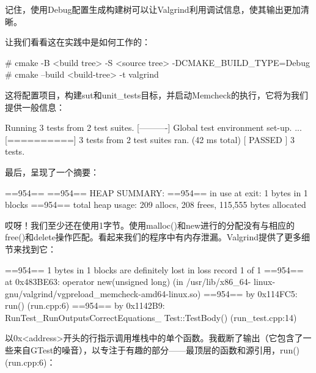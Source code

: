 记住，使用Debug配置生成构建树可以让Valgrind利用调试信息，使其输出更加清晰。

让我们看看这在实践中是如何工作的：

\begin{shell}
# cmake -B <build tree> -S <source tree> -DCMAKE_BUILD_TYPE=Debug
# cmake --build <build-tree> -t valgrind
\end{shell}

这将配置项目，构建sut和unit\_tests目标，并启动Memcheck的执行，它将为我们提供一般信息：

 Running 3 tests from 2 test suites.
[----------] Global test environment set-up.
...
[==========] 3 tests from 2 test suites ran. (42 ms total)
[ PASSED ] 3 tests.
\end{shell}

最后，呈现了一个摘要：

\begin{shell}
==954==
==954== HEAP SUMMARY:
==954==     in use at exit: 1 bytes in 1 blocks
==954==   total heap usage: 209 allocs, 208 frees, 115,555 bytes allocated
\end{shell}

哎呀！我们至少还在使用1字节。使用malloc()和new进行的分配没有与相应的free()和delete操作匹配。看起来我们的程序中有内存泄漏。Valgrind提供了更多细节来找到它：

\begin{shell}
==954== 1 bytes in 1 blocks are definitely lost in loss record 1 of 1
==954==   at 0x483BE63: operator new(unsigned long) (in /usr/lib/x86_64-
linux-gnu/valgrind/vgpreload_memcheck-amd64-linux.so)
==954==   by 0x114FC5: run() (run.cpp:6)
==954==   by 0x1142B9: RunTest_RunOutputsCorrectEquations_
Test::TestBody() (run_test.cpp:14)
\end{shell}

以0x<address>开头的行指示调用堆栈中的单个函数。我截断了输出（它包含了一些来自GTest的噪音），以专注于有趣的部分——最顶层的函数和源引用，run()(run.cpp:6)：

